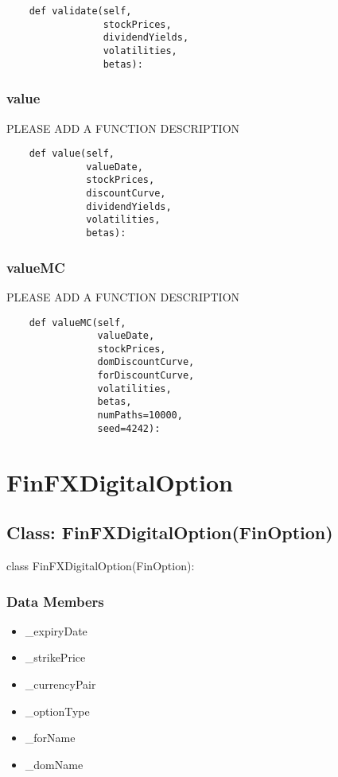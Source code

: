 \documentclass[twoside,11pt]{book}
\begin{document}
\begin{lstlisting}
    def validate(self,
                 stockPrices,
                 dividendYields,
                 volatilities,
                 betas):
\end{lstlisting}

\subsubsection*{{\bf value}}
PLEASE ADD A FUNCTION DESCRIPTION

\begin{lstlisting}
    def value(self,
              valueDate,
              stockPrices,
              discountCurve,
              dividendYields,
              volatilities,
              betas):
\end{lstlisting}

\subsubsection*{{\bf valueMC}}
PLEASE ADD A FUNCTION DESCRIPTION

\begin{lstlisting}
    def valueMC(self,
                valueDate,
                stockPrices,
                domDiscountCurve,
                forDiscountCurve,
                volatilities,
                betas,
                numPaths=10000,
                seed=4242):
\end{lstlisting}

\newpage
\section{FinFXDigitalOption}

\subsection*{Class: FinFXDigitalOption(FinOption)}
class FinFXDigitalOption(FinOption): 

\subsubsection*{Data Members}
\begin{itemize}
\item{\_expiryDate}
\item{\_strikePrice}
\item{\_currencyPair}
\item{\_optionType}
\item{\_forName}
\item{\_domName}
\end{itemize}
\end{document}

